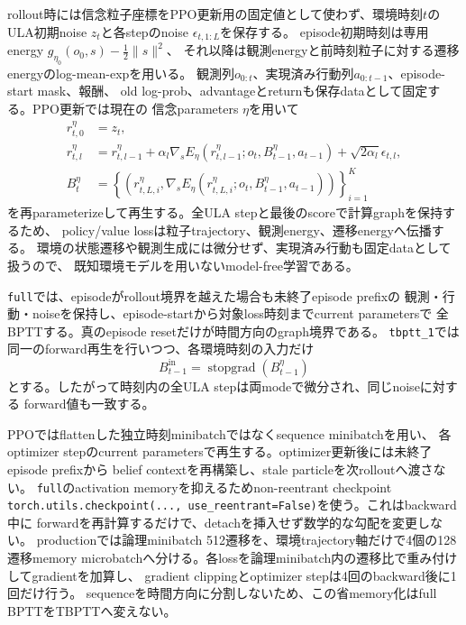 \documentclass[a4paper,11pt]{article}
\newcommand{\stopgrad}{\operatorname{stopgrad}}
\begin{document}
rollout時には信念粒子座標をPPO更新用の固定値として使わず、環境時刻$t$の
ULA初期noise $z_t$と各stepのnoise $\epsilon_{t,1:L}$を保存する。
episode初期時刻は専用energy $g_{\eta_0}(o_0,s)-\frac12\lVert s\rVert^2$、
それ以降は観測energyと前時刻粒子に対する遷移energyのlog-mean-expを用いる。
観測列$o_{0:t}$、実現済み行動列$a_{0:t-1}$、episode-start mask、報酬、
old log-prob、advantageとreturnも保存dataとして固定する。PPO更新では現在の
信念parameters $\eta$を用いて
\begin{align}
  r^\eta_{t,0}&=z_t,\\
  r^\eta_{t,l}
    &=r^\eta_{t,l-1}
      +\alpha_l\nabla_sE_\eta(
        r^\eta_{t,l-1};o_t,B^\eta_{t-1},a_{t-1})
      +\sqrt{2\alpha_l}\epsilon_{t,l},\\
  B^\eta_t
    &=\left\{\left(
      r^\eta_{t,L,i},
      \nabla_sE_\eta(r^\eta_{t,L,i};o_t,B^\eta_{t-1},a_{t-1})
    \right)\right\}_{i=1}^{K}
  \label{eq:full-belief-replay}
\end{align}
を再parameterizeして再生する。全ULA stepと最後のscoreで計算graphを保持するため、
policy/value lossは粒子trajectory、観測energy、遷移energyへ伝播する。
環境の状態遷移や観測生成には微分せず、実現済み行動も固定dataとして扱うので、
既知環境モデルを用いないmodel-free学習である。

\texttt{full}では、episodeがrollout境界を越えた場合も未終了episode prefixの
観測・行動・noiseを保持し、episode-startから対象loss時刻までcurrent parametersで
全BPTTする。真のepisode resetだけが時間方向のgraph境界である。
\texttt{tbptt\_1}では同一のforward再生を行いつつ、各環境時刻の入力だけ
\begin{equation}
  B^{\mathrm{in}}_{t-1}=\stopgrad(B^\eta_{t-1})
  \label{eq:tbptt-one-related}
\end{equation}
とする。したがって時刻内の全ULA stepは両modeで微分され、同じnoiseに対する
forward値も一致する。

PPOではflattenした独立時刻minibatchではなくsequence minibatchを用い、
各optimizer stepのcurrent parametersで再生する。optimizer更新後には未終了episode prefixから
belief contextを再構築し、stale particleを次rolloutへ渡さない。
\texttt{full}のactivation memoryを抑えるためnon-reentrant checkpoint
\verb|torch.utils.checkpoint(..., use_reentrant=False)|を使う。これはbackward中に
forwardを再計算するだけで、detachを挿入せず数学的な勾配を変更しない。
productionでは論理minibatch 512遷移を、環境trajectory軸だけで4個の128遷移memory
microbatchへ分ける。各lossを論理minibatch内の遷移比で重み付けしてgradientを加算し、
gradient clippingとoptimizer stepは4回のbackward後に1回だけ行う。
sequenceを時間方向に分割しないため、この省memory化はfull BPTTをTBPTTへ変えない。
\end{document}
